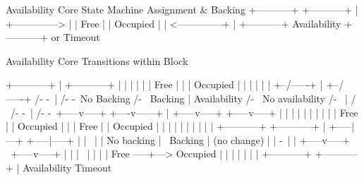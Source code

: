 \begin{verbnobox}[\small]
Availability Core State Machine
              Assignment &
              Backing
+-----------+              +-----------+
|           +-------------->           |
|  Free     |              | Occupied  |
|           <--------------+           |
+-----------+ Availability +-----------+
              or Timeout
\end{verbnobox}

\begin{verbnobox}[\small]
Availability Core Transitions within Block

              +-----------+                |                    +-----------+
              |           |                |                    |           |
              | Free      |                |                    | Occupied  |
              |           |                |                    |           |
              +--/-----\--+                |                    +--/-----\--+
               /-       -\                 |                     /-       -\
 No Backing  /-           \ Backing        |      Availability /-           \ No availability
           /-              \               |                  /              \
         /-                 -\             |                /-                -\
  +-----v-----+         +----v------+      |         +-----v-----+        +-----v-----+
  |           |         |           |      |         |           |        |           |
  | Free      |         | Occupied  |      |         | Free      |        | Occupied  |
  |           |         |           |      |         |           |        |           |
  +-----------+         +-----------+      |         +-----|---\-+        +-----|-----+
                                           |               |    \               |
                                           |    No backing |     \ Backing      | (no change)
                                           |               |     -\             |
                                           |         +-----v-----+ \      +-----v-----+
                                           |         |           |  \     |           |
                                           |         | Free      -----+---> Occupied  |
                                           |         |           |        |           |
                                           |         +-----------+        +-----------+
                                           |                 Availability Timeout
\end{verbnobox}

